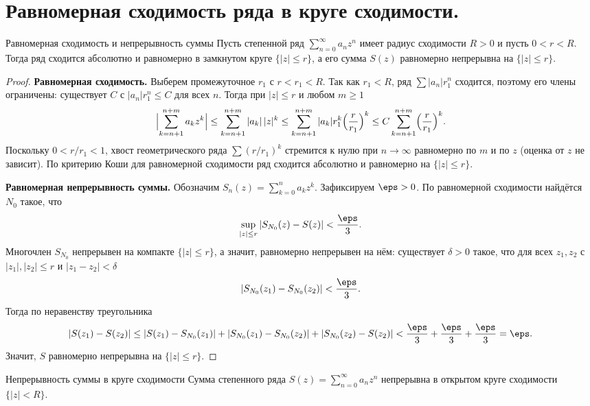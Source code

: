 
\section{Равномерная сходимость ряда в круге сходимости.}

\begin{Theorem}{Равномерная сходимость и непрерывность суммы}{}
	Пусть степенной ряд $\sum_{n=0}^{\infty} a_n z^n$ имеет радиус сходимости $R > 0$ и пусть $0 < r < R$. Тогда ряд сходится абсолютно и равномерно в замкнутом круге $\{|z| \le r\}$, а его сумма $S(z)$ равномерно непрерывна на $\{|z| \le r\}$.
\end{Theorem}

\begin{proof}
	\textbf{Равномерная сходимость.} Выберем промежуточное $r_1$ с $r < r_1 < R$. Так как $r_1 < R$, ряд $\sum |a_n| r_1^n$ сходится, поэтому его члены ограничены: существует $C$ с $|a_n| r_1^n \le C$ для всех $n$. Тогда при $|z| \le r$ и любом $m \ge 1$
	\[
	\Bigl| \sum_{k=n+1}^{n+m} a_k z^k \Bigr|
	\le \sum_{k=n+1}^{n+m} |a_k|\,|z|^k
	\le \sum_{k=n+1}^{n+m} |a_k| r_1^k \Bigl(\frac{r}{r_1}\Bigr)^k
	\le C \sum_{k=n+1}^{n+m} \Bigl(\frac{r}{r_1}\Bigr)^k.
	\]
	Поскольку $0 < r/r_1 < 1$, хвост геометрического ряда $\sum (r/r_1)^k$ стремится к нулю при $n \to \infty$ равномерно по $m$ и по $z$ (оценка от $z$ не зависит). По критерию Коши для равномерной сходимости ряд сходится абсолютно и равномерно на $\{|z| \le r\}$.

	\textbf{Равномерная непрерывность суммы.} Обозначим $S_n(z) = \sum_{k=0}^{n} a_k z^k$. Зафиксируем $\eps > 0$. По равномерной сходимости найдётся $N_0$ такое, что
	\[
	\sup_{|z| \le r} |S_{N_0}(z) - S(z)| < \frac{\eps}{3}.
	\]
	Многочлен $S_{N_0}$ непрерывен на компакте $\{|z| \le r\}$, а значит, равномерно непрерывен на нём: существует $\delta > 0$ такое, что для всех $z_1, z_2$ с $|z_1|, |z_2| \le r$ и $|z_1 - z_2| < \delta$
	\[
	|S_{N_0}(z_1) - S_{N_0}(z_2)| < \frac{\eps}{3}.
	\]
	Тогда по неравенству треугольника
	\[
	|S(z_1) - S(z_2)| \le |S(z_1) - S_{N_0}(z_1)| + |S_{N_0}(z_1) - S_{N_0}(z_2)| + |S_{N_0}(z_2) - S(z_2)| < \frac{\eps}{3} + \frac{\eps}{3} + \frac{\eps}{3} = \eps.
	\]
	Значит, $S$ равномерно непрерывна на $\{|z| \le r\}$.
\end{proof}

\begin{Corollary}{Непрерывность суммы в круге сходимости}{}
	Сумма степенного ряда $S(z) = \sum_{n=0}^{\infty} a_n z^n$ непрерывна в открытом круге сходимости $\{|z| < R\}$.
\end{Corollary}


